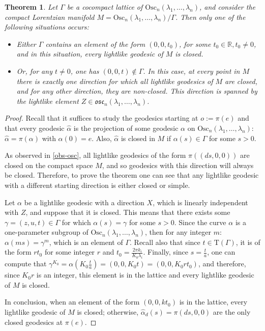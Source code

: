 \documentclass[12pt]{amsart}
\theoremstyle{plain}
\newtheorem{thm}{Theorem}[section]
\theoremstyle{definition}
\theoremstyle{remark}
\begin{document}
\begin{thm}\label{teoremaoscilador}
    Let \( \Gamma \) be a cocompact lattice of \( \text{Osc}_n(\lambda_1, \ldots, \lambda_n) \), and consider the compact Lorentzian manifold \( M = \text{Osc}_n(\lambda_1, \ldots, \lambda_n) / \Gamma \). Then only one of the following situations occurs:
    \begin{itemize}
        \item Either \( \Gamma \) contains an element of the form \( (0, 0, t_0) \), for some \( t_0 \in \mathbb{R}, t_0 \neq 0 \), and in this situation, every lightlike geodesic of \( M \) is closed.
        \item Or, for any \( t \neq 0 \), one has \( (0, 0, t) \notin \Gamma \). In this case, at every point in \( M \) there is exactly one direction for which all lightlike geodesics of \( M \) are closed, and for any other direction, they are non-closed. This direction is spanned by the lightlike element \( Z \in \mathfrak{osc}_n(\lambda_1, \ldots, \lambda_n) \).
    \end{itemize}
\end{thm}

\begin{proof}
    Recall that it suffices to study the geodesics starting at \( o := \pi(e) \) and that every geodesic \( \hat{\alpha} \) is the projection of some geodesic \( \alpha \) on \( \text{Osc}_n(\lambda_1, \ldots, \lambda_n) \): \( \hat{\alpha} = \pi(\alpha) \) with \( \alpha(0) = e \). Also, \( \hat{\alpha} \) is closed in \( M \) if \( \alpha(s) \in \Gamma \) for some \( s > 0 \).
    
    As observed in \ref{obs-osc}, all lightlike geodesics of the form \( \pi((ds, 0, 0)) \) are closed on the compact space \( M \), and so geodesics with this direction will always be closed. Therefore, to prove the theorem one can see that any lightlike geodesic with a different starting direction is either closed or simple.
    
    Let \( \alpha \) be a lightlike geodesic with a direction \( X \), which is linearly independent with \( Z \), and suppose that it is closed. This means that there exists some \( \gamma = (z, u, t) \in \Gamma \) for which \( \alpha(s) = \gamma \) for some \( s > 0 \). Since the curve \( \alpha \) is a one-parameter subgroup of \( \text{Osc}_n(\lambda_1, \ldots, \lambda_n) \), then for any integer \( m \): \( \alpha(ms) = \gamma^m \), which is an element of \( \Gamma \). Recall also that since \( t \in \mathrm{T}(\Gamma) \), it is of the form \( r t_0 \) for some integer \( r \) and \( t_0 = \frac{2 \pi k_i}{K_0 \lambda_i} \). Finally, since \( s = \frac{t}{a} \), one can compute that \( \gamma^{K_0} = \alpha\left(K_0 \frac{t}{a}\right) = (0, 0, K_0 t) = (0, 0, K_0 r t_0) \), and therefore, since \( K_0 r \) is an integer, this element is in the lattice and every lightlike geodesic of \( M \) is closed.
    
    In conclusion, when an element of the form \( (0, 0, k t_0) \) is in the lattice, every lightlike geodesic of \( M \) is closed; otherwise, \( \hat{\alpha}_d(s) = \pi(ds, 0, 0) \) are the only closed geodesics at \( \pi(e) \).
\end{proof}
\end{document}

